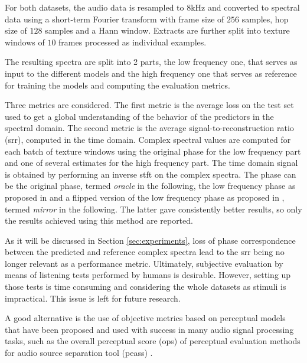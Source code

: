 \documentclass{article}
\begin{document}
For both datasets, the audio data is resampled to $8$kHz and converted to spectral data using a short-term Fourier transform with frame size of $256$ samples, hop size of $128$ samples and a Hann window. Extracts are further split into texture windows of $10$ frames processed as individual examples.

The resulting spectra are split into 2 parts, the low frequency one, that serves as input to the different models and the high frequency one that serves as reference for training the models and computing the evaluation metrics.

Three metrics are considered. The first metric is the average loss on the test set used to get a global understanding of the behavior of the predictors in the spectral domain. The second metric is the average signal-to-reconstruction ratio (srr), computed in the time domain. Complex spectral values are computed for each batch of texture windows using the original phase for the low frequency part and one of several estimates for the high frequency part. The time domain signal is obtained by performing an inverse stft on the complex spectra. The phase can be the original phase, termed \textit{oracle} in the following, the low frequency phase as proposed in \cite{miron2018high} and a flipped version of the low frequency phase as proposed in \cite{li2015deep}, termed \textit{mirror} in the following. The latter gave consistently better results, so only the results achieved using this method are reported.

As it will be discussed in Section \ref{sec:experiments}, loss of phase correspondence between the predicted and reference complex spectra lead to the srr being no longer relevant as a performance metric. Ultimately, subjective evaluation by means of listening tests performed by humans is desirable. However, setting up those tests is time consuming and considering the whole datasets as stimuli is impractical. This issue is left for future research.

A good alternative is the use of objective metrics based on perceptual models that have been proposed and used with success in many audio signal processing tasks, such as the overall perceptual score (ops) of perceptual evaluation methods for audio source separation tool (peass) \cite{emiya2011subjective}. %

\end{document}
